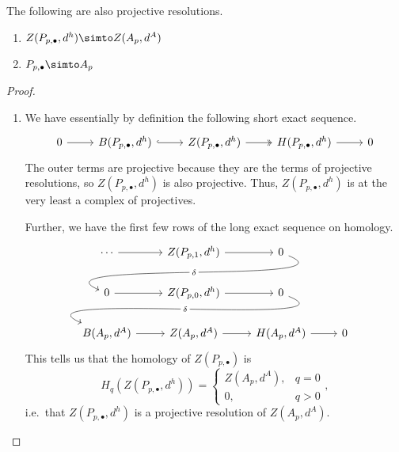 \documentclass[main.tex]{subfiles}
\begin{document}
\begin{proposition}
  The following are also projective resolutions.
  \begin{enumerate}
    \item $Z(P_{p,\bullet}, d^{h}) \simto Z(A_{p}, d^{A})$

    \item $P_{p,\bullet} \simto A_{p}$
  \end{enumerate}
\end{proposition}
\begin{proof}
  \leavevmode
  \begin{enumerate}
    \item We have essentially by definition the following short exact sequence.
      \begin{equation*}
        \begin{tikzcd}
          0
          \arrow[r]
          & B(P_{p, \bullet}, d^{h})
          \arrow[r, hook]
          & Z(P_{p, \bullet}, d^{h})
          \arrow[r, two heads]
          & H(P_{p, \bullet}, d^{h})
          \arrow[r]
          & 0
        \end{tikzcd}
      \end{equation*}
      The outer terms are projective because they are the terms of projective resolutions, so $Z(P_{p,\bullet}, d^{h})$ is also projective. Thus, $Z(P_{p,\bullet}, d^{h})$ is at the very least a complex of projectives.

      Further, we have the first few rows of the long exact sequence on homology.
      \begin{equation*}
        \begin{tikzcd}
          \cdots
          \arrow[r]
          & Z(P_{p, 1}, d^{h})
          \arrow[r]
          & 0
          \\
          0
          \arrow[r]
          \arrow[from=urr, out=-22, in=157, looseness=1, overlay, "\delta" description]
          & Z(P_{p, 0}, d^{h})
          \arrow[r]
          & 0
          \\
          B(A_{p}, d^{A})
          \arrow[r]
          \arrow[from=urr, out=-22, in=157, looseness=1, overlay, "\delta" description]
          & Z(A_{p}, d^{A})
          \arrow[r]
          & H(A_{p}, d^{A})
          \arrow[r]
          & 0
        \end{tikzcd}
      \end{equation*}
      This tells us that the homology of $Z(P_{p, \bullet})$ is
      \begin{equation*}
        H_{q}(Z(P_{p, \bullet}, d^{h})) =
        \begin{cases}
          Z(A_{p}, d^{A}), & q = 0 \\
          0, & q > 0
        \end{cases},
      \end{equation*}
      i.e.\ that $Z(P_{p, \bullet}, d^{h})$ is a projective resolution of $Z(A_{p}, d^{A})$.


\end{enumerate}
\end{proof}
\end{document}
